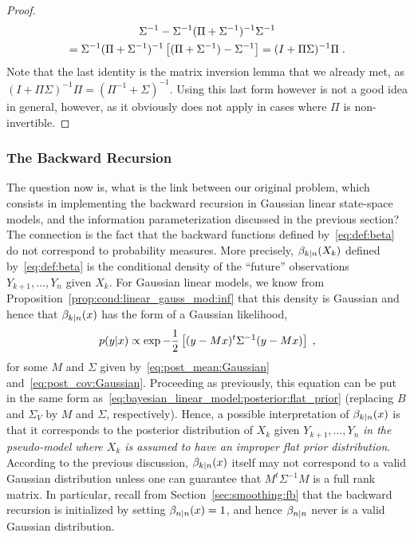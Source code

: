 \begin{proof}
  \begin{multline*}
    \Sigma^{-1} - \Sigma^{-1}(\Pi+\Sigma^{-1})^{-1}\Sigma^{-1} \\
    = \Sigma^{-1}(\Pi+\Sigma^{-1})^{-1} \left[(\Pi+\Sigma^{-1}) - \Sigma^{-1}\right] = (I + \Pi\Sigma)^{-1} \Pi \; .
  \end{multline*}
  Note that the last identity is the  matrix
  inversion lemma that we already met, as $(I + \Pi\Sigma)^{-1} \Pi =
  (\Pi^{-1} + \Sigma)^{-1}$. Using this last form however is not
  a good idea in general, however,
  as it obviously does not apply in cases where $\Pi$ is
  non-invertible.
\end{proof}

\subsubsection{The Backward Recursion}
The question now is, what is the link between our original problem, which
consists in implementing the backward recursion in Gaussian linear state-space
models, and the information parameterization discussed in the previous section?
The connection is the fact that the backward functions defined
by~\eqref{eq:def:beta} do not correspond to probability measures. More
precisely, $\beta_{k|n}(X_k)$ defined by~\eqref{eq:def:beta} is the
conditional density of the ``future'' observations $Y_{k+1}, \dots, Y_n$
given $X_k$. For Gaussian linear models, we know from
Proposition~\ref{prop:cond:linear_gauss_mod:inf} that this density is
Gaussian and hence that $\beta_{k|n}(x)$ has the form of a Gaussian
likelihood,
\[
 p(y|x) \propto \exp -\frac{1}{2}\left[(y-Mx)^t\Sigma^{-1}(y-Mx)\right] \; ,
\]
for some $M$ and $\Sigma$ given by~\eqref{eq:post_mean:Gaussian}
and~\eqref{eq:post_cov:Gaussian}. Proceeding as previously, this equation can
be put in the same form
as~\eqref{eq:bayesian_linear_model:posterior:flat_prior} (replacing $B$ and
$\Sigma_V$ by $M$ and $\Sigma$, respectively). Hence, a possible interpretation
of $\beta_{k|n}(x)$ is that it corresponds to the posterior distribution of
$X_k$ given $Y_{k+1}, \dots, Y_n$ {\em in the pseudo-model where $X_k$ is
  assumed to have an improper flat prior distribution}. According to the
previous discussion, $\beta_{k|n}(x)$ itself may not correspond to a valid
Gaussian distribution unless one can guarantee that $M^t \Sigma^{-1} M$ is a
full rank matrix. In particular, recall from Section~\ref{sec:smoothing:fb}
that the backward recursion is initialized by setting $\beta_{n|n}(x) = 1$,
and hence $\beta_{n|n}$ never is a valid Gaussian distribution.


